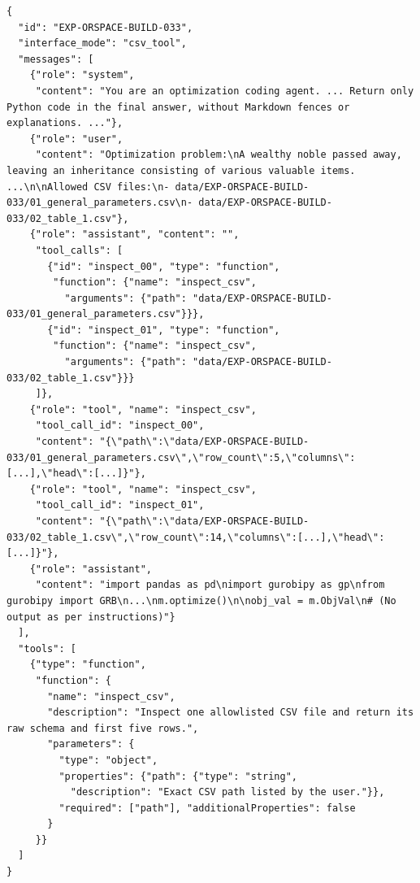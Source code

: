 \documentclass[11pt]{article}
\begin{document}
\begin{enumerate}[label=(AssoE.\arabic*),leftmargin=*]
\begin{enumerate}[label=(R2.Major.\arabic*),leftmargin=*]
\begin{tcolorbox}[colback=white,colframe=boxgrey,coltitle=white,coltext=black,title=SFT Data Format,breakable,fonttitle=\bfseries,fontupper=\small,before upper={\lstdefinestyle{sftrecord}{basicstyle=\footnotesize\ttfamily,breaklines=true,breakatwhitespace=false,columns=fullflexible,keepspaces=true,showstringspaces=false,aboveskip=4pt,belowskip=4pt}}]
\begin{lstlisting}[style=sftrecord]
{
  "id": "EXP-ORSPACE-BUILD-033",
  "interface_mode": "csv_tool",
  "messages": [
    {"role": "system",
     "content": "You are an optimization coding agent. ... Return only Python code in the final answer, without Markdown fences or explanations. ..."},
    {"role": "user",
     "content": "Optimization problem:\nA wealthy noble passed away, leaving an inheritance consisting of various valuable items. ...\n\nAllowed CSV files:\n- data/EXP-ORSPACE-BUILD-033/01_general_parameters.csv\n- data/EXP-ORSPACE-BUILD-033/02_table_1.csv"},
    {"role": "assistant", "content": "",
     "tool_calls": [
       {"id": "inspect_00", "type": "function",
        "function": {"name": "inspect_csv",
          "arguments": {"path": "data/EXP-ORSPACE-BUILD-033/01_general_parameters.csv"}}},
       {"id": "inspect_01", "type": "function",
        "function": {"name": "inspect_csv",
          "arguments": {"path": "data/EXP-ORSPACE-BUILD-033/02_table_1.csv"}}}
     ]},
    {"role": "tool", "name": "inspect_csv",
     "tool_call_id": "inspect_00",
     "content": "{\"path\":\"data/EXP-ORSPACE-BUILD-033/01_general_parameters.csv\",\"row_count\":5,\"columns\":[...],\"head\":[...]}"},
    {"role": "tool", "name": "inspect_csv",
     "tool_call_id": "inspect_01",
     "content": "{\"path\":\"data/EXP-ORSPACE-BUILD-033/02_table_1.csv\",\"row_count\":14,\"columns\":[...],\"head\":[...]}"},
    {"role": "assistant",
     "content": "import pandas as pd\nimport gurobipy as gp\nfrom gurobipy import GRB\n...\nm.optimize()\n\nobj_val = m.ObjVal\n# (No output as per instructions)"}
  ],
  "tools": [
    {"type": "function",
     "function": {
       "name": "inspect_csv",
       "description": "Inspect one allowlisted CSV file and return its raw schema and first five rows.",
       "parameters": {
         "type": "object",
         "properties": {"path": {"type": "string",
           "description": "Exact CSV path listed by the user."}},
         "required": ["path"], "additionalProperties": false
       }
     }}
  ]
}
\end{lstlisting}
\end{tcolorbox}


\end{enumerate}
\end{enumerate}
\end{document}
